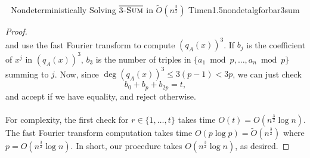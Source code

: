 \begin{theorem}{\Stop\,\,\cite{carmosino2016nseth} Nondeterministically Solving \(\bar{3\textsc{-Sum}}\) in \(\tilde{O}(n^{\frac{3}{2}})\) Time}{n1.5nondetalgforbar3sum}
\begin{proof}
\begin{equation*}
                \end{equation*}
                and use the fast Fourier transform to compute \((q_A(x))^3\). If \(b_j\) is the coefficient of \(x^j\) in \((q_A(x))^3\), \(b_3\) is the number of triples in \(\{a_1\bmod p,\ldots,a_n\bmod p\}\) summing to \(j\). Now, since \(\deg (q_A(x))^3\leq 3(p-1)<3p\), we can just check
                \begin{equation*}
                    b_0+b_{p}+b_{2p}=t,
                \end{equation*}
                and accept if we have equality, and reject otherwise.
                \\
                \\
                For complexity, the first check for \(r\in\{1,\ldots,t\}\) takes time \(O(t)=O\left(n^{\frac{3}{2}}\log n\right)\). The fast Fourier transform computation takes time \(O(p\log p)=\tilde{O}\left(n^\frac{3}{2}\right)\) where \(p=O\left(n^{\frac{3}{2}}\log n\right)\). In short, our procedure takes \(O\left(n^{\frac{3}{2}}\log n\right)\), as desired.
            \end{proof}
        \end{theorem}